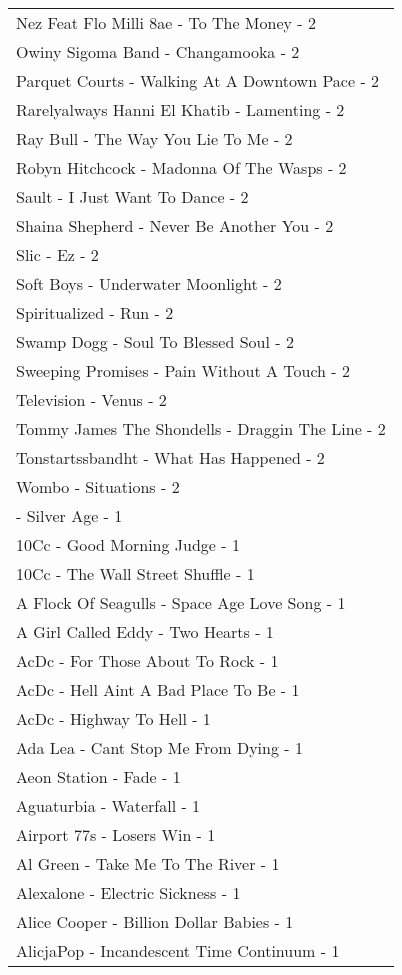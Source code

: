 \documentclass[
]{article}
\begin{document}
\begin{longtable}{l}
Nez Feat Flo Milli 8ae - To The Money - 2 \\ 
Owiny Sigoma Band - Changamooka - 2 \\ 
Parquet Courts - Walking At A Downtown Pace - 2 \\ 
Rarelyalways Hanni El Khatib - Lamenting - 2 \\ 
Ray Bull - The Way You Lie To Me - 2 \\ 
Robyn Hitchcock - Madonna Of The Wasps - 2 \\ 
Sault - I Just Want To Dance - 2 \\ 
Shaina Shepherd - Never Be Another You - 2 \\ 
Slic - Ez - 2 \\ 
Soft Boys - Underwater Moonlight - 2 \\ 
Spiritualized - Run - 2 \\ 
Swamp Dogg - Soul To Blessed Soul - 2 \\ 
Sweeping Promises - Pain Without A Touch - 2 \\ 
Television - Venus - 2 \\ 
Tommy James The Shondells - Draggin The Line - 2 \\ 
Tonstartssbandht - What Has Happened - 2 \\ 
Wombo - Situations - 2 \\ 
 - Silver Age - 1 \\ 
10Cc - Good Morning Judge - 1 \\ 
10Cc - The Wall Street Shuffle - 1 \\ 
A Flock Of Seagulls - Space Age Love Song - 1 \\ 
A Girl Called Eddy - Two Hearts - 1 \\ 
AcDc - For Those About To Rock - 1 \\ 
AcDc - Hell Aint A Bad Place To Be - 1 \\ 
AcDc - Highway To Hell - 1 \\ 
Ada Lea - Cant Stop Me From Dying - 1 \\ 
Aeon Station - Fade - 1 \\ 
Aguaturbia - Waterfall - 1 \\ 
Airport 77s - Losers Win - 1 \\ 
Al Green - Take Me To The River - 1 \\ 
Alexalone - Electric Sickness - 1 \\ 
Alice Cooper - Billion Dollar Babies - 1 \\ 
AlicjaPop - Incandescent Time Continuum - 1 \\ 

\end{longtable}
\end{document}
